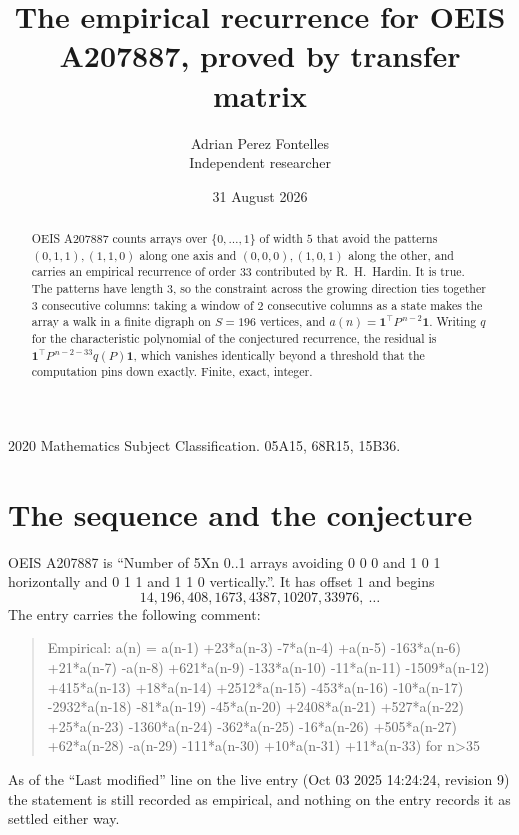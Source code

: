 \documentclass[11pt,a4paper]{article}
\title{The empirical recurrence for OEIS A207887, proved by transfer matrix}
\author{Adrian Perez Fontelles\\ \small Independent researcher}
\date{31 August 2026}
\theoremstyle{plain}
\theoremstyle{definition}
\begin{document}
\maketitle

\begin{abstract}
OEIS A207887 counts arrays over $\{0,\dots,1\}$ of width $5$ that avoid the patterns
$(0,1,1), (1,1,0)$ along one axis and $(0,0,0), (1,0,1)$ along the other, and carries an empirical recurrence of
order $33$ contributed by R.~H.~Hardin. It is true. The patterns have length $3$, so
the constraint across the growing direction ties together $3$ consecutive columns: taking a
window of $2$ consecutive columns as a state makes the array a walk in a finite digraph
on $S=196$ vertices, and $a(n)=\mathbf{1}^{\!\top}P^{\,n-2}\mathbf{1}$. Writing $q$
for the characteristic polynomial of the conjectured recurrence, the residual is
$\mathbf{1}^{\!\top}P^{\,n-2-33}q(P)\mathbf{1}$, which vanishes identically
beyond a threshold that the computation pins down exactly. Finite, exact, integer.
\end{abstract}

\noindent\small 2020 Mathematics Subject Classification. 05A15, 68R15, 15B36.\normalsize

\section{The sequence and the conjecture}

OEIS A207887 is ``Number of 5Xn 0..1 arrays avoiding 0 0 0 and 1 0 1 horizontally and 0 1 1 and 1 1 0 vertically.''. It has offset
$1$ and begins
\[
14, 196, 408, 1673, 4387, 10207, 33976,\ \dots
\]
The entry carries the following comment:
\begin{quote}\small
Empirical: a(n) = a(n-1) +23*a(n-3) -7*a(n-4) +a(n-5) -163*a(n-6) +21*a(n-7) -a(n-8) +621*a(n-9) -133*a(n-10) -11*a(n-11) -1509*a(n-12) +415*a(n-13) +18*a(n-14) +2512*a(n-15) -453*a(n-16) -10*a(n-17) -2932*a(n-18) -81*a(n-19) -45*a(n-20) +2408*a(n-21) +527*a(n-22) +25*a(n-23) -1360*a(n-24) -362*a(n-25) -16*a(n-26) +505*a(n-27) +62*a(n-28) -a(n-29) -111*a(n-30) +10*a(n-31) +11*a(n-33) for n>35
\end{quote}
As of the ``Last modified'' line on the live entry (Oct 03 2025 14:24:24, revision
9) the statement is still recorded as empirical, and nothing on the entry
records it as settled either way.
\end{document}
